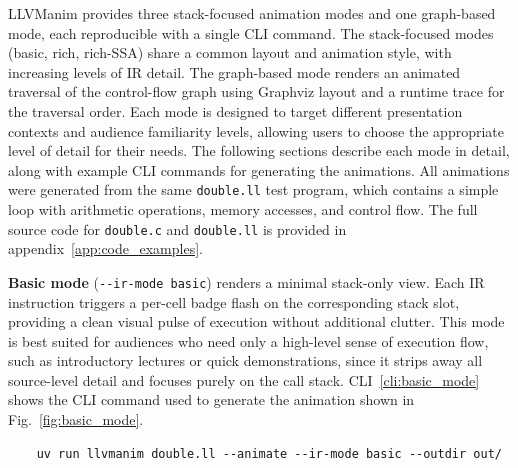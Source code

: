 LLVManim provides three stack-focused animation modes and one graph-based mode, each reproducible with a single CLI command. The stack-focused modes (basic, rich, rich-SSA) share a common layout and animation style, with increasing levels of IR detail. The graph-based mode renders an animated traversal of the control-flow graph using Graphviz layout and a runtime trace for the traversal order. Each mode is designed to target different presentation contexts and audience familiarity levels, allowing users to choose the appropriate level of detail for their needs. The following sections describe each mode in detail, along with example CLI commands for generating the animations. All animations were generated from the same \texttt{double.ll} test program, which contains a simple loop with arithmetic operations, memory accesses, and control flow. The full source code for \texttt{double.c} and \texttt{double.ll} is provided in appendix~\ref{app:code_examples}.

\vspace{2ex}

\textbf{Basic mode} (\texttt{-{}-ir-mode basic}) renders a minimal stack-only view. Each IR instruction triggers a per-cell badge flash on the corresponding stack slot, providing a clean visual pulse of execution without additional clutter. This mode is best suited for audiences who need only a high-level sense of execution flow, such as introductory lectures or quick demonstrations, since it strips away all source-level detail and focuses purely on the call stack. CLI~\ref{cli:basic_mode} shows the CLI command used to generate the animation shown in Fig.~\ref{fig:basic_mode}.
\vspace{-2ex}
\begin{clilisting}[h]
  \begin{verbatim}
    uv run llvmanim double.ll --animate --ir-mode basic --outdir out/
  \end{verbatim}
  \vspace{-5ex}
  \caption{Command to generate the basic mode animation shown in Fig.~\ref{fig:basic_mode}.}
  \label{cli:basic_mode}
\end{clilisting}

